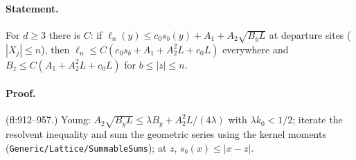 \paragraph{Statement.} For $d\geq3$ there is $C$: if $\ell_n(y)\leq c_0s_b(y)+A_1+A_2\sqrt{B_yL}$ at departure sites ($|X_j|\leq n$), then $\ell_n\leq C(c_0s_b+A_1+A_2^2L+c_0L)$ everywhere and $B_z\leq C(A_1+A_2^2L+c_0L)$ for $b\leq|z|\leq n$.
\paragraph{Proof.} (fl:912--957.) Young: $A_2\sqrt{B_yL}\leq\lambda B_y+A_2^2L/(4\lambda)$ with $\lambda k_0<1/2$; iterate the resolvent inequality and sum the geometric series using the kernel moments (\texttt{Generic/Lattice/SummableSums}); at $z$, $s_b(x)\leq|x-z|$.
